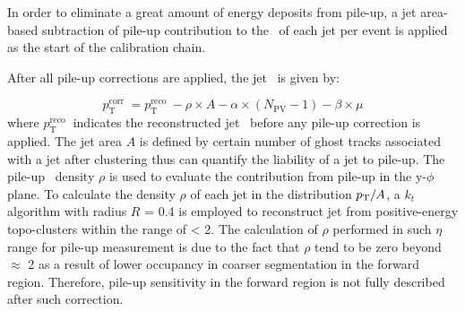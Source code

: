 In order to eliminate a great amount of energy deposits from pile-up, a jet area-based subtraction of pile-up contribution to the \pt~of each jet per event is applied as the start of the calibration chain. 

After all pile-up corrections are applied, the jet \pt~is given by:

\begin{equation}
p_{\mathrm{T}}^{\text {corr }}=p_{\mathrm{T}}^{\text {reco }}-\rho \times A-\alpha \times\left(N_{\mathrm{PV}}-1\right)-\beta \times \mu
\end{equation}
where $p_{\mathrm{T}}^{\text {reco }}$ indicates the reconstructed jet \pt~before any pile-up correction is applied. The jet area $A$ is defined by certain number of ghost tracks associated with a jet after clustering thus can quantify the liability of a jet to pile-up.  The pile-up \pt~density $\rho$ is used to evaluate the contribution from pile-up in the y-$\phi$ plane. To calculate the density $\rho$ of each jet in the distribution $p_{\mathrm{T}}/A$, a $k_t$ algorithm with radius $R$ = 0.4 is employed to reconstruct jet from positive-energy topo-clusters within the range of \abseta < 2. The calculation of $\rho$ performed in such $\eta$ range for pile-up measurement is due to the fact that $\rho$ tend to be zero beyond \abseta~$\approx$ 2 as a result of lower occupancy in coarser segmentation in the forward region. Therefore, pile-up sensitivity in the forward region is not fully described after such correction.  


